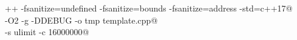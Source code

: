 \documentclass[9pt, a4paper, notitlepage]{extreport}
\begin{document}
	\thispagestyle{fancy}
	\begin{minipage}{0.49\linewidth}
	\maketeampage
	\verb@g++ -fsanitize=undefined -fsanitize=bounds -fsanitize=address -std=c++17@ \\
	\verb@-O2 -g -DDEBUG -o tmp template.cpp@ \\
	\verb@ulimit -s ulimit -c 16000000@
	\end{minipage}
	\hfill
	\begin{minipage}{0.49\linewidth}
	\end{minipage}
	\begin{multicols*}{3}
	\end{multicols*}
\end{document}
